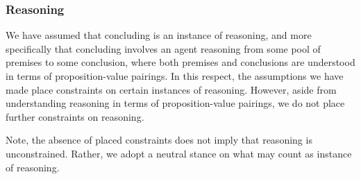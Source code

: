 \subsubsection{Reasoning}
\label{sec:reasoning-1}

\begin{note}
  We have assumed that concluding is an instance of reasoning, and more specifically that concluding involves an agent reasoning from some pool of premises to some conclusion, where both premises and conclusions are understood in terms of proposition-value pairings.
  In this respect, the assumptions we have made place constraints on certain instances of reasoning.
  However, aside from understanding reasoning in terms of proposition-value pairings, we do not place further constraints on reasoning.

  Note, the absence of placed constraints does not imply that reasoning is unconstrained.
  Rather, we adopt a neutral stance on what may count as instance of reasoning.
\end{note}

